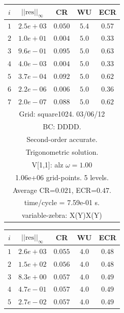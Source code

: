 \begin{table}[hbt]
\begin{center}
{%
\begin{tabular}{|c|c|c|c|c|} \hline 
 $i$   & $\vert\vert\mbox{res}\vert\vert_\infty$  &  CR     &  WU    & ECR  \\   \hline 
 $ 1$  & $ 2.5e+03$ & $0.050$ & $ 5.4$ & $0.57$ \\ 
 $ 2$  & $ 1.0e+01$ & $0.004$ & $ 5.0$ & $0.33$ \\ 
 $ 3$  & $ 9.6e-01$ & $0.095$ & $ 5.0$ & $0.63$ \\ 
 $ 4$  & $ 4.0e-03$ & $0.004$ & $ 5.0$ & $0.33$ \\ 
 $ 5$  & $ 3.7e-04$ & $0.092$ & $ 5.0$ & $0.62$ \\ 
 $ 6$  & $ 2.2e-06$ & $0.006$ & $ 5.0$ & $0.36$ \\ 
 $ 7$  & $ 2.0e-07$ & $0.088$ & $ 5.0$ & $0.62$ \\ 
\hline 
\multicolumn{5}{|c|}{Grid: square1024. 03/06/12}  \\
\multicolumn{5}{|c|}{BC: DDDD.}  \\
\multicolumn{5}{|c|}{Second-order accurate.}  \\
\multicolumn{5}{|c|}{Trigonometric solution.}  \\
\multicolumn{5}{|c|}{V[1,1]: alz $\omega=1.00$}  \\
\multicolumn{5}{|c|}{1.06e+06 grid-points. 5 levels.}  \\
\multicolumn{5}{|c|}{Average CR=$0.021$, ECR=$0.47$.}  \\
\multicolumn{5}{|c|}{time/cycle = 7.59e-01 s.}  \\
\multicolumn{5}{|c|}{variable-zebra: X(Y)X(Y)}  \\
\hline 
\end{tabular}
\begin{tabular}{|c|c|c|c|c|} \hline 
 $i$   & $\vert\vert\mbox{res}\vert\vert_\infty$  &  CR     &  WU    & ECR  \\   \hline 
 $ 1$  & $ 2.6e+03$ & $0.055$ & $ 4.0$ & $0.48$ \\ 
 $ 2$  & $ 1.5e+02$ & $0.056$ & $ 4.0$ & $0.48$ \\ 
 $ 3$  & $ 8.3e+00$ & $0.057$ & $ 4.0$ & $0.49$ \\ 
 $ 4$  & $ 4.7e-01$ & $0.057$ & $ 4.0$ & $0.49$ \\ 
 $ 5$  & $ 2.7e-02$ & $0.057$ & $ 4.0$ & $0.49$ \\ 

\end{tabular}}
\end{center}
\end{table}
